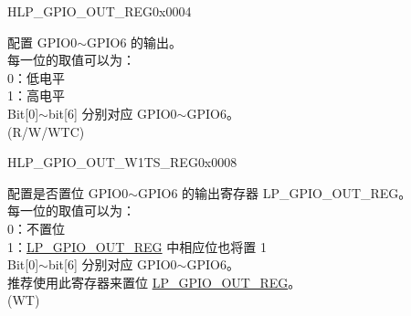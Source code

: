 \begin{register}{H}{LP\_GPIO\_OUT\_REG}{0x0004}\label{regdesc:LPGPIOOUTREG}
%
%
\regnewline%
\begin{regdesc}\begin{reglist}
\label{fielddesc:LPGPIOOUTDATAORIG}\item [LP\_GPIO\_OUT\_DATA\_ORIG] 配置 GPIO0$\sim$GPIO6 的输出。\\
每一位的取值可以为：\\
0：低电平\\
1：高电平\\
Bit[0]$\sim$bit[6] 分别对应 GPIO0$\sim$GPIO6。\\ (R/W/WTC)
\end{reglist}\end{regdesc}
\end{register}


\begin{register}{H}{LP\_GPIO\_OUT\_W1TS\_REG}{0x0008}\label{regdesc:LPGPIOOUTW1TSREG}
%
%
\regnewline%
\begin{regdesc}\begin{reglist}
\label{fielddesc:LPGPIOOUTW1TS}\item [LP\_GPIO\_OUT\_W1TS] 配置是否置位 GPIO0$\sim$GPIO6 的输出寄存器 LP\_GPIO\_OUT\_REG。\\
每一位的取值可以为：\\
0：不置位\\
1：\hyperref[regdesc:LPGPIOOUTREG]{LP\_GPIO\_OUT\_REG} 中相应位也将置 1\\
Bit[0]$\sim$bit[6] 分别对应 GPIO0$\sim$GPIO6。\\
推荐使用此寄存器来置位 \hyperref[regdesc:LPGPIOOUTREG]{LP\_GPIO\_OUT\_REG}。 \\
(WT)
\end{reglist}\end{regdesc}
\end{register}



